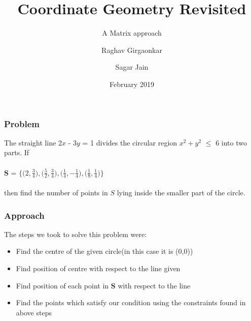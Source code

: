 \documentclass[xcolor=dvipsnames]{beamer}
\title{Coordinate Geometry Revisited}
\subtitle{A Matrix approach}
\author{Raghav Girgaonkar \and Sagar Jain}
\institute{Indian Institute of Technology Hyderabad}
\date{February 2019}
\begin{document}
 
\frame{\titlepage}
 
\begin{frame}
\frametitle{Problem}
The straight line 2$x$ - 3$y$ = 1 divides the circular region $x^{2} + y^{2}$ $\leqslant$ 6 into two parts. If\\~\\
$\boldsymbol{S}$ = $\Bigg \lbrace \bigg(2,$\(\frac{3}{4}\)$\bigg),\bigg($\(\frac{5}{2}\)$,$\(\frac{3}{4}\)$\bigg),\bigg($\(\frac{1}{4}\)$,$\(-\frac{1}{4}\)$\bigg),\bigg($\(\frac{1}{8}\)$,$\(\frac{1}{4}\)$\bigg)\Bigg\rbrace$
\\~\\
then find the number of points in $S$ lying inside the smaller part of the circle.
\end{frame}

\begin{frame}
\frametitle{Approach}
The steps we took to solve this problem were:
\begin{itemize}
 \item<1-> Find the centre of the given circle(in this case it is (0,0))
 \item<2-> Find position of centre with respect to the line given
 \item<3-> Find position of each point in $\boldsymbol{S}$ with respect to the line
 \item<4-> Find the points which satisfy our condition using the constraints found in above steps
\end{itemize}

\end{frame}
\end{document}
